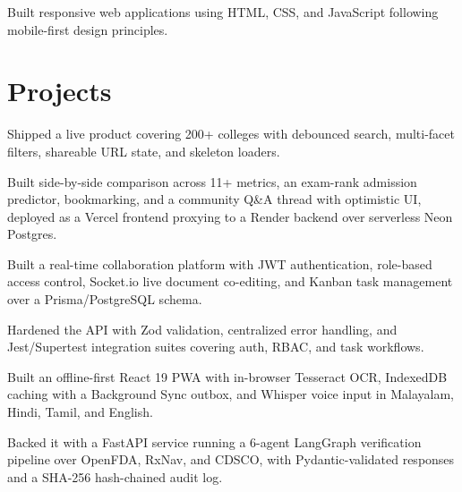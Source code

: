 \documentclass[a4paper,10pt]{article}
\begin{document}
\begin{points}
  \item Built responsive web applications using HTML, CSS, and JavaScript following mobile-first design principles.
\end{points}

\section{Projects}

\begin{points}
  \item Shipped a live product covering 200+ colleges with debounced search, multi-facet filters, shareable URL state, and skeleton loaders.
  \item Built side-by-side comparison across 11+ metrics, an exam-rank admission predictor, bookmarking, and a community Q\&A thread with optimistic UI, deployed as a Vercel frontend proxying to a Render backend over serverless Neon Postgres.
\end{points}
\gap

\begin{points}
  \item Built a real-time collaboration platform with JWT authentication, role-based access control, Socket.io live document co-editing, and Kanban task management over a Prisma/PostgreSQL schema.
  \item Hardened the API with Zod validation, centralized error handling, and Jest/Supertest integration suites covering auth, RBAC, and task workflows.
\end{points}
\gap

\begin{points}
  \item Built an offline-first React 19 PWA with in-browser Tesseract OCR, IndexedDB caching with a Background Sync outbox, and Whisper voice input in Malayalam, Hindi, Tamil, and English.
  \item Backed it with a FastAPI service running a 6-agent LangGraph verification pipeline over OpenFDA, RxNav, and CDSCO, with Pydantic-validated responses and a SHA-256 hash-chained audit log.
\end{points}
\gap
\end{document}
